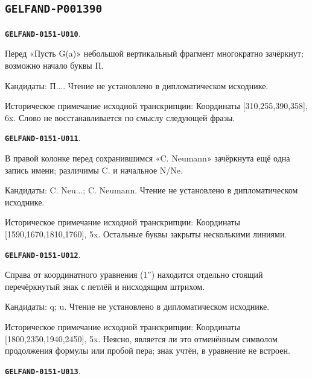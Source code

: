 \documentclass[11pt]{article}
\theoremstyle{definition}
\theoremstyle{remark}
\begin{document}
\subsection*{\texttt{GELFAND-P001390}}
\par\noindent\leavevmode{}\label{GELFAND-0151-U010}\label{GELFAND-P001390:cancelled-let:note}\textbf{\texttt{GELFAND-0151-U010}}.\nopagebreak[4]\par
Перед «Пусть G(a)» небольшой вертикальный фрагмент многократно зачёркнут; возможно начало буквы П.\par
Кандидаты: П.... Чтение не установлено в дипломатическом исходнике.\par
Историческое примечание исходной транскрипции: Координаты [310,255,390,358], 6x. Слово не восстанавливается по смыслу следующей фразы.\par\medskip
\par\noindent\leavevmode{}\label{GELFAND-0151-U011}\label{GELFAND-P001390:cancelled-neumann:note}\textbf{\texttt{GELFAND-0151-U011}}.\nopagebreak[4]\par
В правой колонке перед сохранившимся «C. Neumann» зачёркнута ещё одна запись имени; различимы C. и начальное N/Ne.\par
Кандидаты: C. Neu...; C. Neumann. Чтение не установлено в дипломатическом исходнике.\par
Историческое примечание исходной транскрипции: Координаты [1590,1670,1810,1760], 5x. Остальные буквы закрыты несколькими линиями.\par\medskip
\par\noindent\leavevmode{}\label{GELFAND-0151-U012}\label{GELFAND-P001390:equation-end:note}\textbf{\texttt{GELFAND-0151-U012}}.\nopagebreak[4]\par
Справа от координатного уравнения (1′′) находится отдельно стоящий перечёркнутый знак с петлёй и нисходящим штрихом.\par
Кандидаты: q; u. Чтение не установлено в дипломатическом исходнике.\par
Историческое примечание исходной транскрипции: Координаты [1800,2350,1940,2450], 5x. Неясно, является ли это отменённым символом продолжения формулы или пробой пера; знак учтён, в уравнение не встроен.\par\medskip
\par\noindent\leavevmode{}\label{GELFAND-0151-U013}\label{GELFAND-P001390:constants-note:note}\textbf{\texttt{GELFAND-0151-U013}}.\nopagebreak[4]\par
\end{document}
